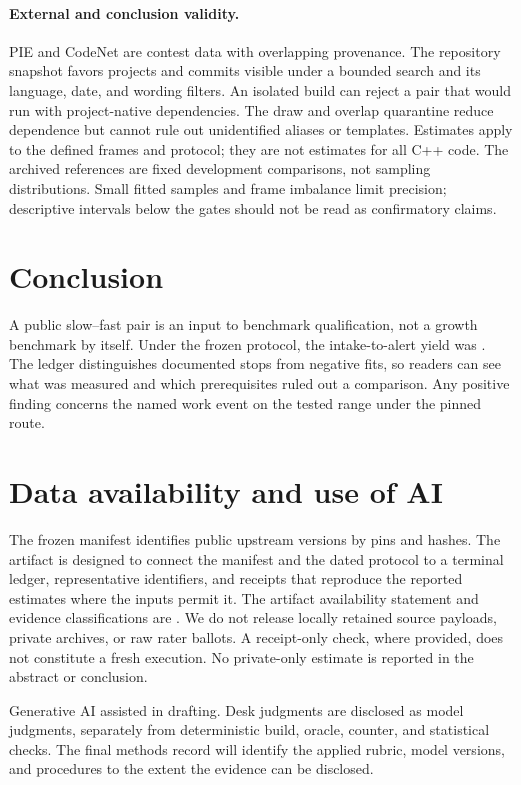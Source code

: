\documentclass[11pt]{article}
\begin{document}
\paragraph{External and conclusion validity.}
PIE and CodeNet are contest data with overlapping provenance. The
repository snapshot favors projects and commits visible under a bounded
search and its language, date, and wording filters. An isolated build
can reject a pair that would run with project-native dependencies. The
draw and overlap quarantine reduce dependence but cannot rule out
unidentified aliases or templates. Estimates apply to the defined
frames and protocol; they are not estimates for all C++ code. The
archived references are fixed development comparisons, not sampling
distributions. Small fitted samples and frame imbalance limit
precision; descriptive intervals below the gates should not be read as
confirmatory claims.

\section{Conclusion}

A public slow--fast pair is an input to benchmark qualification, not a
growth benchmark by itself. Under the frozen protocol, the
intake-to-alert yield was \BenchIntakeAlertRate. \BenchConclusionTakeaway{}
The ledger distinguishes documented stops from negative fits, so readers
can see what was measured and which prerequisites ruled out a comparison.
Any positive finding concerns the named work event on the tested range
under the pinned route.

\section*{Data availability and use of AI}

The frozen manifest identifies public upstream versions by pins and hashes.
The artifact is designed to connect the manifest and the dated protocol
to a terminal ledger, representative identifiers, and receipts that
reproduce the reported estimates where the inputs permit it. The artifact
availability statement and evidence classifications are \BenchAvailability.
We do not release locally retained source payloads, private archives,
or raw rater ballots. A receipt-only check, where provided, does not
constitute a fresh execution. No private-only estimate is reported in the
abstract or conclusion.

Generative AI assisted in drafting. Desk judgments are disclosed as
model judgments, separately from deterministic build, oracle, counter,
and statistical checks.
The final methods record will identify the applied rubric, model
versions, and procedures to the extent the evidence can be disclosed.



\end{document}
